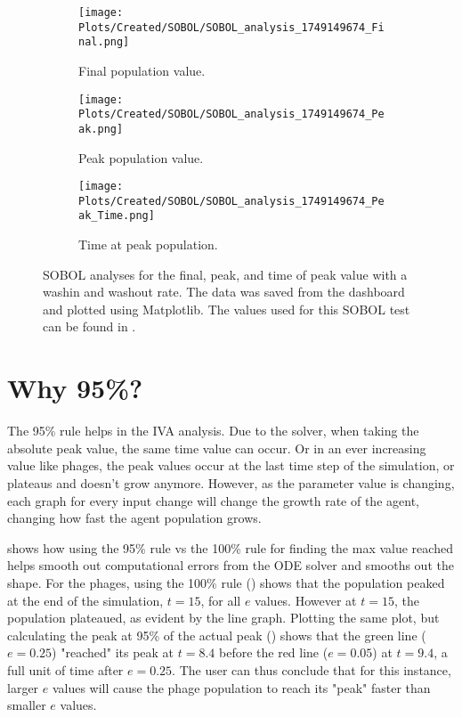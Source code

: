 \begin{figure}[ht!]
    \centering
    \begin{subfigure}{0.32\linewidth}
        \centering
        \captionsetup{width=1\linewidth}
        \texttt{[image: Plots/Created/SOBOL/SOBOL\_analysis\_1749149674\_Final.png]}
        \caption{
            Final population value. 
        }
        \label{fig:created:SOBOL_final}
    \end{subfigure}
    \hfill
    \begin{subfigure}{0.32\linewidth}
        \centering
        \captionsetup{width=1\linewidth}
        \texttt{[image: Plots/Created/SOBOL/SOBOL\_analysis\_1749149674\_Peak.png]}
        \caption{
            Peak population value. 
        }
        \label{fig:created:SOBOL_peak}
    \end{subfigure}
    \hfill
    \begin{subfigure}{0.32\linewidth}
        \centering
        \captionsetup{width=1\linewidth}
        \texttt{[image: Plots/Created/SOBOL/SOBOL\_analysis\_1749149674\_Peak\_Time.png]}
        \caption{
            Time at peak population. 
        }
        \label{fig:created:SOBOL_peak_time}
    \end{subfigure}
    \caption{
        SOBOL analyses for the final, peak, and time of peak value with a washin and washout rate. 
        The data was saved from the dashboard and plotted using Matplotlib. 
        The values used for this SOBOL test can be found in . 
    }
    \label{fig:created:SOBOL_analyses}
\end{figure}

\section{Why 95\%? }
\label{sec:appendixF:why_95}
The 95\% rule helps in the IVA analysis. 
Due to the solver, when taking the absolute peak value, the same time value can occur. 
Or in an ever increasing value like phages, the peak values occur at the last time step of the simulation, or plateaus and doesn't grow anymore. 
However, as the parameter value is changing, each graph for every input change will change the growth rate of the agent, changing how fast the agent population grows. 

 shows how using the 95\% rule vs the 100\% rule for finding the max value reached helps smooth out computational errors from the ODE solver and smooths out the shape. 
For the phages, using the 100\% rule () shows that the population peaked at the end of the simulation, $t=15$, for all $e$ values. 
However at $t=15$, the population plateaued, as evident by the line graph. 
Plotting the same plot, but calculating the peak at 95\% of the actual peak () shows that the green line ($e=0.25$) "reached" its peak at $t=8.4$ before the red line ($e=0.05$) at $t=9.4$, a full unit of time after $e=0.25$. 
The user can thus conclude that for this instance, larger $e$ values will cause the phage population to reach its "peak" faster than smaller $e$ values. 

